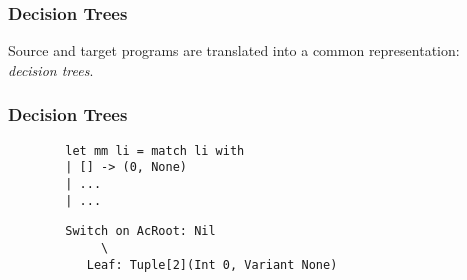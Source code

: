 \documentclass{beamer}
\begin{document}
\begin{frame}
  \frametitle{Decision Trees}
  Source and target programs are translated into a common representation: \emph{decision trees}.
\end{frame}

\begin{frame}[fragile]
  \frametitle{Decision Trees}
  \begin{small}
    \hspace{-1em}
    \begin{minipage}{0.36\linewidth}
      \begin{lstlisting}
        let mm li = match li with
        | [] -> (0, None)
        | ...
        | ...
      \end{lstlisting}
      \hrulefill
      \begin{lstlisting}
        Switch on AcRoot: Nil
             \
           Leaf: Tuple[2](Int 0, Variant None)
      \end{lstlisting}
    \end{minipage}
  \end{small}
\end{frame}
\end{document}
